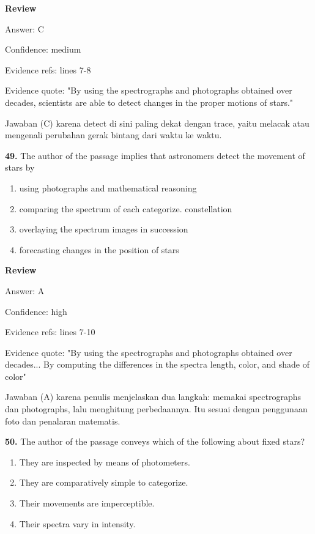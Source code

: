 \documentclass[12pt]{article}
\begin{document}
\setlength{\parskip}{0pt}
\setlength{\parindent}{0pt}
\textbf{Review}\par
Answer: C\par
Confidence: medium\par
Evidence refs: lines 7-8\par
Evidence quote: "By using the spectrographs and photographs obtained over decades, scientists are able to detect changes in the proper motions of stars."\par
Jawaban (C) karena detect di sini paling dekat dengan trace, yaitu melacak atau mengenali perubahan gerak bintang dari waktu ke waktu.\par
\endgroup
\par
\vspace{0.25\baselineskip}
\noindent\textbf{49.} The author of the passage implies that astronomers detect the movement of stars by
\begin{enumerate}[label=(\Alph*),leftmargin=*,itemsep=0.2em]
\item using photographs and mathematical reasoning
\item comparing the spectrum of each categorize. constellation
\item overlaying the spectrum images in succession
\item forecasting changes in the position of stars
\end{enumerate}
\par
\begingroup
\setlength{\parskip}{0pt}
\setlength{\parindent}{0pt}
\textbf{Review}\par
Answer: A\par
Confidence: high\par
Evidence refs: lines 7-10\par
Evidence quote: "By using the spectrographs and photographs obtained over decades... By computing the differences in the spectra length, color, and shade of color"\par
Jawaban (A) karena penulis menjelaskan dua langkah: memakai spectrographs dan photographs, lalu menghitung perbedaannya. Itu sesuai dengan penggunaan foto dan penalaran matematis.\par
\endgroup
\par
\vspace{0.25\baselineskip}
\noindent\textbf{50.} The author of the passage conveys which of the following about fixed stars?
\begin{enumerate}[label=(\Alph*),leftmargin=*,itemsep=0.2em]
\item They are inspected by means of photometers.
\item They are comparatively simple to categorize.
\item Their movements are imperceptible.
\item Their spectra vary in intensity.
\end{enumerate}
\end{document}
